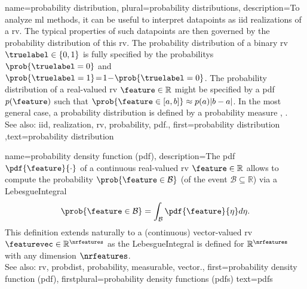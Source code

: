 {name={probability distribution}, plural={probability distributions},
	description={To analyze \gls{ml} methods, it can be useful 
		to interpret \glspl{datapoint} as \gls{iid} \glspl{realization} of a \gls{rv}. The typical 
		properties of such \glspl{datapoint} are then governed by the \gls{probability} distribution 
		of this \gls{rv}. The \gls{probability} distribution of a binary \gls{rv} $\truelabel \in \{0,1\}$ 
		is fully specified by the \glspl{probability} $\prob{\truelabel = 0}$ and 
		$\prob{\truelabel=1}\!=\!1\!-\!\prob{\truelabel=0}$. The \gls{probability} 
		distribution of a real-valued \gls{rv} $\feature \in \mathbb{R}$ might be specified 
		by a \gls{pdf} $p(\feature)$ such that $\prob{ \feature \in [a,b] } \approx  p(a) |b-a|$. 
	    	In the most general case, a \gls{probability} distribution is defined by a \gls{probability} measure 
		\cite{BillingsleyProbMeasure}, \cite{GrayProbBook}.
	    		\\
		See also: \gls{iid}, \gls{realization}, \gls{rv}, \gls{probability}, \gls{pdf}.},
	first={probability distribution}
	,text={probability distribution}
}
    
    
{name={probability density function (pdf)},
	description={The pdf 
	$\pdf{\feature}{\cdot}$ of a continuous real-valued \gls{rv} $\feature \in \mathbb{R}$ 
	allows to compute the \gls{probability} $\prob{\feature \in \mathcal{B}}$ (of 
	the \gls{event} $\mathcal{B} \subseteq \mathbb{R}$)
	via a \gls{LebesgueIntegral} \cite[Ch. 3]{BertsekasProb}
	 $$\prob{\feature \in \mathcal{B}} = \int_{\mathcal{B}} \pdf{\feature}{\eta} d 
	 \eta.$$ 
	 This definition extends naturally to a (continuous) vector-valued \gls{rv} 
	 $\featurevec \in \mathbb{R}^{\nrfeatures}$ as the \gls{LebesgueIntegral} 
	 is defined for $\mathbb{R}^{\nrfeatures}$ with any \gls{dimension} $\nrfeatures$. 
        		\\
		See also: \gls{rv}, \gls{probdist}, \gls{probability}, \gls{measurable}, \gls{vector}.},
	first={probability density function (pdf)},
	firstplural={probability density functions (pdfs)}
	text={pdfs}
}


